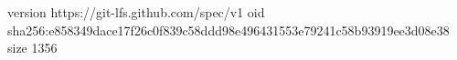version https://git-lfs.github.com/spec/v1
oid sha256:e858349dace17f26c0f839c58ddd98e496431553e79241c58b93919ee3d08e38
size 1356
